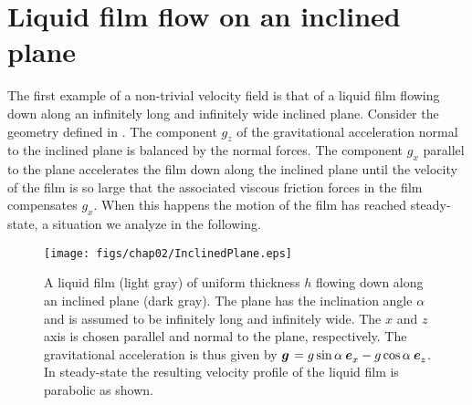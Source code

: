 \section{Liquid film flow on an inclined plane}

The first example of a non-trivial velocity field is that of a
liquid film flowing down along an infinitely long and infinitely
wide inclined plane. Consider the geometry defined in
. The component $g^{{}}_z$ of the
gravitational acceleration normal to the inclined plane is
balanced by the normal forces. The component $g^{{}}_x$ parallel
to the plane accelerates the film down along the inclined plane
until the velocity of the film is so large that the associated
viscous friction forces in the film compensates $g^{{}}_x$. When
this happens the motion of the film has reached steady-state, a
situation we analyze in the following.

\begin{figure}
\centerline{
  \texttt{[image: figs/chap02/InclinedPlane.eps]}}
\caption[Liquid film flow on an inclined
plane]{ A liquid film (light gray) of
uniform thickness $h$ flowing down along an inclined plane (dark
gray). The plane has the inclination angle $\alpha$ and is assumed
to be infinitely long and infinitely wide. The $x$ and $z$ axis is
chosen parallel and normal to the plane, respectively. The
gravitational acceleration is thus given by $\bm{g}^{{}_{}} = g \sin\alpha\:
\bm{e}^{{}_{}}_x - g \cos\alpha\: \bm{e}^{{}_{}}_z$. In steady-state the resulting
velocity profile of the liquid film is parabolic as shown.}
\end{figure}


